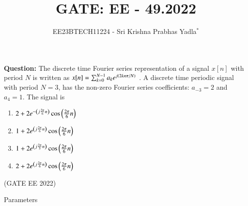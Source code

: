 \documentclass[journal,12pt,twocolumn]{IEEEtran}
\theoremstyle{remark}
\begin{document}

\vspace{3cm}

\title{GATE: EE - 49.2022}
\author{EE23BTECH11224 - Sri Krishna Prabhas Yadla$^{*}$%
}
\maketitle
\newpage
\bigskip

\renewcommand{\thefigure}{\arabic{figure}}
\renewcommand{\thetable}{\arabic{table}}


\vspace{3cm}
\textbf{Question:} The discrete time Fourier series representation of a signal $x[n]$ with period $N$ is written as  $x[n]=\sum_{k=0}^{N-1}a_ke^{j\left(2kn\pi/N\right)}$ . A discrete time periodic signal with period $N=3$, has the non-zero Fourier series coefficients: $a_{-3}=2$ and $a_4=1$. The signal is
\begin{enumerate}[label=(\Alph*)]
\item $2+2e^{-\left(j\frac{2\pi}{6}n\right)}\cos{\ensuremath{\left(\frac{2\pi}{6}n\right)}}$
\item $1+2e^{\left(j\frac{2\pi}{6}n\right)}\cos{\ensuremath{\left(\frac{2\pi}{6}n\right)}}$
\item $1+2e^{\left(j\frac{2\pi}{3}n\right)}\cos{\ensuremath{\left(\frac{2\pi}{6}n\right)}}$
\item $2+2e^{\left(j\frac{2\pi}{6}n\right)}\cos{\ensuremath{\left(\frac{2\pi}{6}n\right)}}$
\end{enumerate}
\hfill(GATE EE 2022)
\\
\solution
\begin{table}[htbp]
	\centering
	\def\arraystretch{1.5}
	
	\caption{Parameters}
	\label{tab:parameters_ee_49}
\end{table}
\end{document}
